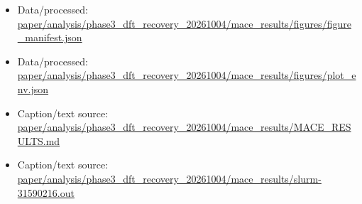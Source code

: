 \begin{itemize}[leftmargin=1.4em,noitemsep]
\item Data/processed: \begingroup\scriptsize\url{paper/analysis/phase3_dft_recovery_20261004/mace_results/figures/figure_manifest.json}\endgroup
\item Data/processed: \begingroup\scriptsize\url{paper/analysis/phase3_dft_recovery_20261004/mace_results/figures/plot_env.json}\endgroup
\item Caption/text source: \begingroup\scriptsize\url{paper/analysis/phase3_dft_recovery_20261004/mace_results/MACE_RESULTS.md}\endgroup
\item Caption/text source: \begingroup\scriptsize\url{paper/analysis/phase3_dft_recovery_20261004/mace_results/slurm-31590216.out}\endgroup
\end{itemize}
